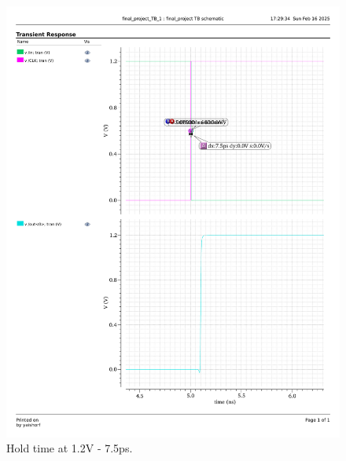 \documentclass[a4paper,12pt]{article}
\begin{document}
\begin{figure}[H]
    \centering
    \begin{minipage}{0.49\textwidth}
        \centering
        \includegraphics[width=\textwidth]{graphs/hold_1.2_7.5p.pdf}
        \caption{Hold time at 1.2V - 7.5ps.}
    \end{minipage}
    \hfill
    \begin{minipage}{0.49\textwidth}
        \centering

\end{minipage}
\end{figure}
\end{document}
